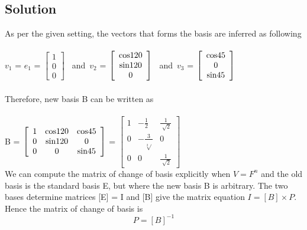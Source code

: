 \documentclass[12pt]{article}
\newcommand\tab[1][1cm]{\hspace*{#1}}
\begin{document}
\subsection{Solution}
\noindent
\tab As per the given setting, the vectors that forms the basis are inferred as following \\ \\
\noindent
\tab 
\textnormal{ $v_1$ = $e_1$ = }
$\left[ \begin{array}{c}
  1 \\
  0 \\
  0
\end{array} \right]$
\textnormal{\ and\ $v_2$ = }
$\left[ \begin{array}{c}
  \textnormal{cos} 120 \\
  \textnormal{sin} 120 \\
  0 
\end{array} \right]$
\textnormal{\ and\ $v_3$ = }
$\left[ \begin{array}{c}
  \textnormal{cos} 45 \\
  0 \\
  \textnormal{sin} 45 
\end{array} \right]$
\\
\\
\tab Therefore, new basis B can be written as
\\ \\
\tab \tab \textnormal{B = }
$\left[ \begin{array}{ccc}
  1 & \textnormal{cos} 120 &\textnormal{cos} 45 \\
  0 & \textnormal{sin} 120 & 0\\
  0 & 0& \textnormal{sin} 45  
\end{array} \right]$
\textnormal{ = }
$\left[ \begin{array}{ccc}
  1 & -\frac{1}{2} & \frac{1}{\sqrt[]{2}} \\
  0 & -\frac{3}{\sqrt[2]{}} & 0 \\
  0 & 0 & \frac{1}{\sqrt[]{2}} 
\end{array} \right]$
\\
\noindent
\tab We can compute the matrix of change of basis explicitly when $V = F^n$ and the old basis is the standard basis E, but where the new basis B is arbitrary. The two bases determine matrices [E] = I and [B] give the matrix equation $I = [B] \times P$. Hence the matrix of change of basis is
\begin{equation}
P = [B]^{-1}
\end{equation}
\noindent
\end{document}

